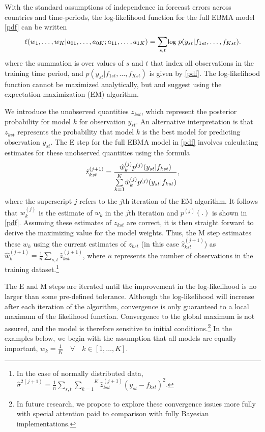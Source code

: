\documentclass[pdftex,12pt,fullpage,oneside]{amsart}
\begin{document}
With the standard assumptions of independence in forecast errors
across countries and time-periods, the log-likelihood function for the
full EBMA model \eqref{pdf} can be written
\begin{equation}
\small
  \ell (w_1, \ldots, w_K | a_{01},  \ldots, a_{0K}; a_{11},
  \ldots, a_{1K})= \underset{s,t}{\sum}\mbox{log }p(y_{st} |
  f_{1st}, \ldots, f_{Kst}).
\end{equation}
\noindent where the summation is over values of $s$ and $t$ that index
all observations in the training time period, and $p(y_{st}|f_{1st},
\ldots, f_{Kst}) $ is given by \eqref{pdf}. The log-likelihood
function cannot be maximized analytically, but \citet{Raftery:2005}
and \citet{Sloughter:2007} suggest using the expectation-maximization
(EM) algorithm.

We introduce the unobserved quantities $z_{kst}$, which represent the
posterior probability for model $k$ for observation $y_{st}$. An
alternative interpretation is that $z_{kst}$ represents the
probability that model $k$ is the best model for predicting
observation $y_{st}$.  The E step for the full EBMA model in
\eqref{pdf} involves calculating estimates for these unobserved
quantities using the formula
\begin{equation}
\small
\hat{z}^{(j+1)}_{kst} = \frac{\hat{w}^{(j)}_k
p^{(j)}(y_{st}|f_{kst})}{\overset{K}{\underset{k=1}{\sum}}\hat{w}^{(j)}_kp^{(j)}(y_{st}|f_{kst})},
\end{equation}
\noindent where the superscript $j$ refers to the $j$th iteration of
the EM algorithm. It follows that $w_k^{(j)}$ is the estimate of $w_k$
in the $j$th iteration and $p^{(j)}(.)$ is shown in \eqref{pdf}.
Assuming these estimates of $z_{kst}$ are correct, it is then straight
forward to derive the maximizing value for the model weights. Thus,
the M step estimates these $w_k$ using the current estimates of
$z_{kst}$ (in this case $\hat{z}^{(j+1)}_{kst}$) as
$\hat{w}^{(j+1)}_k=\frac{1}{n}\underset{s,t}{\sum}\hat{z}^{(j+1)}_{kst}$,
where $n$ represents the number of observations in the training
dataset.\footnote{ In the case of normally distributed data,
  $\hat{\sigma}^{2(j+1)}=\frac{1}{n}\underset{s,t}{\sum}\overset{K}{\underset{k=1}{\sum}}\hat{z}^{(j+1)}_{kst}(y_{st}-f_{kst})^2$.}


The E and M steps are iterated until the improvement in the
log-likelihood is no larger than some pre-defined tolerance.  Although
the log-likelihood will increase after each iteration of the
algorithm, convergence is only guaranteed to a local maximum of the
likelihood function.  Convergence to the global maximum is not
assured, and the model is therefore sensitive to initial
conditions.\footnote{In future research, we propose to explore these
  convergence issues more fully with special attention paid to
  comparison with fully Bayesian implementations.} In the examples
below, we begin with the assumption that all models are equally
important, $w_k = \frac{1}{K} \quad \forall \quad k \in [1, \ldots, K]$.
\end{document}

